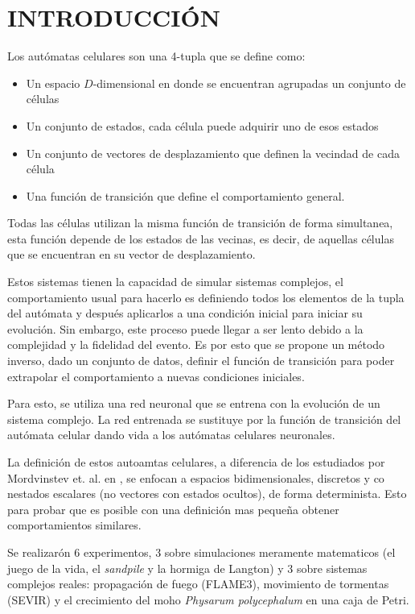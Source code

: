 \section{INTRODUCCIÓN}

Los autómatas celulares son una 4-tupla que se define como:

\begin{itemize}
	\item Un espacio $D$-dimensional en donde se encuentran agrupadas un conjunto de células
	\item Un conjunto de estados, cada célula puede adquirir uno de esos estados
	\item Un conjunto de vectores de desplazamiento que definen la vecindad de cada célula
	\item Una función de transición que define el comportamiento general.
\end{itemize}

Todas las células utilizan la misma función de transición de forma simultanea, esta función depende de los estados de las vecinas, es decir, de aquellas células que se encuentran en su vector de desplazamiento.

Estos sistemas tienen la capacidad de simular sistemas complejos, el comportamiento usual para hacerlo es definiendo todos los elementos de la tupla del autómata y después aplicarlos a una condición inicial para iniciar su evolución. Sin embargo, este proceso puede llegar a ser lento debido a la complejidad y la fidelidad del evento. Es por esto que se propone un método inverso, dado un conjunto de datos, definir el función de transición para poder extrapolar el comportamiento a nuevas condiciones iniciales. 

Para esto, se utiliza una red neuronal que se entrena con la evolución de un sistema complejo. La red entrenada se sustituye por la función de transición del autómata celular dando vida a los autómatas celulares neuronales.

La definición de estos autoamtas celulares, a diferencia de los estudiados por Mordvinstev et. al. en \cite{}, se enfocan a espacios bidimensionales, discretos y co nestados escalares (no vectores con estados ocultos), de forma determinista. Esto para probar que es posible con una definición mas pequeña obtener comportamientos similares. 

Se realizarón 6 experimentos, 3 sobre simulaciones meramente matematicos (el juego de la vida, el \textit{sandpile} y la hormiga de Langton) y 3 sobre sistemas complejos reales: propagación de fuego (FLAME3), movimiento de tormentas (SEVIR) y el crecimiento del moho \textit{Physarum polycephalum} en una caja de Petri.


